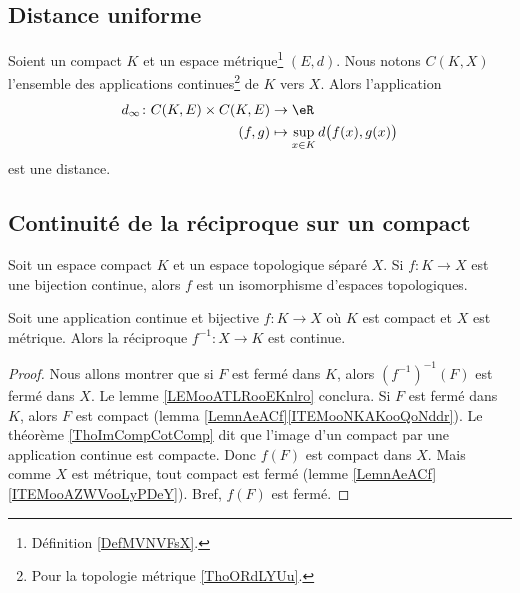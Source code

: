 \subsection{Distance uniforme}

\begin{proposition}	\label{PROPooNSCCooJuqOQe}
	Soient un compact \( K\) et un espace métrique\footnote{Définition \ref{DefMVNVFsX}.} \( (E,d)\). Nous notons \( C(K,X)\) l'ensemble des applications continues\footnote{Pour la topologie métrique \ref{ThoORdLYUu}.} de \( K\) vers \( X\). Alors l'application
	\begin{equation}
		\begin{aligned}
			d_{\infty}\colon C(K,E)\times C(K,E) & \to \eR                                     \\
			(f,g)                                & \mapsto \sup_{x\in K}d\big( f(x),g(x) \big)
		\end{aligned}
	\end{equation}
	est une distance.
\end{proposition}


\subsection{Continuité de la réciproque sur un compact}

\begin{lemma}       \label{LEMooNEEVooSeHYzx}
	Soit un espace compact \( K\) et un espace topologique séparé \( X\). Si \( f\colon K\to X\) est une bijection continue, alors \( f\) est un isomorphisme d'espaces topologiques.
\end{lemma}

\begin{lemma}     \label{LEMooPLGTooATIGov}
	Soit une application continue et bijective \( f\colon K\to X \) où \( K\) est compact et \( X\) est métrique. Alors la réciproque \(f^{-1}\colon X\to K\) est continue.
\end{lemma}

\begin{proof}
	Nous allons montrer que si \( F\) est fermé dans \( K\), alors \( (f^{-1})^{-1}(F)\) est fermé dans \( X\). Le lemme \ref{LEMooATLRooEKnlro} conclura. Si \( F\) est fermé dans \( K\), alors \( F\) est compact (lemma \ref{LemnAeACf}\ref{ITEMooNKAKooQoNddr}). Le théorème \ref{ThoImCompCotComp} dit que l'image d'un compact par une application continue est compacte. Donc \( f(F)\) est compact dans \( X\). Mais comme \( X\) est métrique, tout compact est fermé (lemme \ref{LemnAeACf}\ref{ITEMooAZWVooLyPDeY}). Bref, \( f(F)\) est fermé.
\end{proof}


